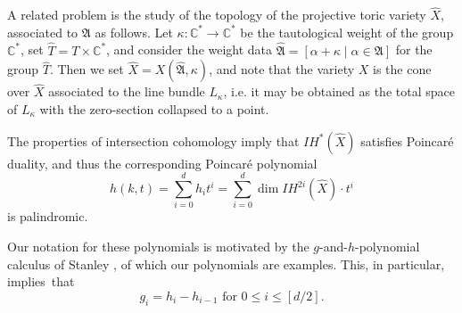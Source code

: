 \documentclass[11pt]{article}
\theoremstyle{definition}
\numberwithin{equation}{section}
\newcommand{\A}{\mathfrak{A}}
\newcommand{\C}{\mathbb{C}}
\begin{document}
A related problem is the study of the topology of the projective toric variety 
$ \widehat{X}$,
associated to $ \A $ as follows. Let $ \kappa:\C^*\to\C^* $ be the tautological 
weight of the group $ \C^* $, set $ \hat T = T\times\C^* $, and consider 
the weight data $ \widehat{\A}= [\alpha+\kappa \mid \alpha\in \A] $ for the group $ \hat T $.
Then we set $ \widehat{X}=X(\widehat{\A},\kappa)$, and note that
the variety $ X $ is the cone over $ \widehat{X}$ 
associated to the line bundle $ L_\kappa $, i.e.  it may be obtained as the 
total space of $ L_\kappa $ with the zero-section collapsed to a point. 

The properties of intersection cohomology imply that $ IH^*(\widehat{X}) $ 
satisfies Poincar\'e duality,
and thus the corresponding Poincar\'e polynomial
\[   h(k,t)=   \sum_{i=0}^d h_it^i = \sum_{i=0}^{d} \dim IH^{2i}(\widehat{X})\cdot t^i \]
is palindromic.  


Our notation for these polynomials is motivated by the $ g$-and-$ h 
$-polynomial calculus of Stanley 
\cite{Stanley}, of which our polynomials are examples. This, in particular, 
implies~that 
\begin{equation}\label{ghrelation}
	g_i = h_i - h_{i-1}\text{ for }  0\le i \le[d/2] .
\end{equation}
\end{document}
